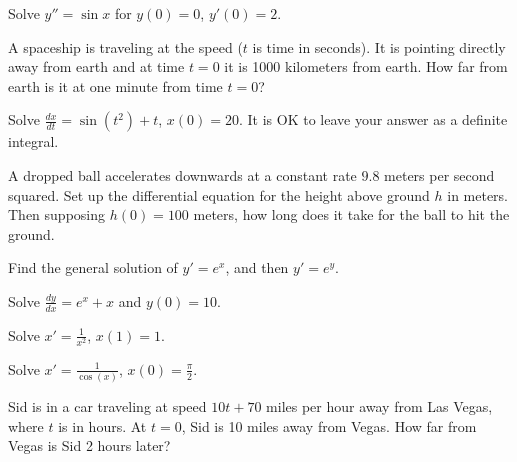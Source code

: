 \documentclass[12pt]{book}
\begin{document}
\begin{exercise}[harder]
Solve $y'' = \sin x$ for $y(0)=0$, $y'(0) = 2$.
\end{exercise}

\begin{exercise}
A spaceship is traveling at the speed  ($t$ is
time in seconds).  It is pointing directly away from earth and at time $t=0$
it is 1000 kilometers from earth.  How far from earth is it at one minute from
time $t=0$?
\end{exercise}

\begin{exercise}
Solve $\frac{dx}{dt} = \sin(t^2)+t$, $x(0)=20$.  It is OK to leave your
answer as a definite integral.
\end{exercise}

\begin{exercise}
A dropped ball accelerates downwards at a constant rate $9.8$ meters per second
squared.  Set up the differential equation for the height above ground $h$ in meters.
Then supposing $h(0) = 100$ meters, how long does it take for the ball to hit
the ground.
\end{exercise}

\begin{exercise}
Find the general solution of
$y' = e^x$,  and then $y' = e^y$.
\end{exercise}


\setcounter{exercise}{100}

\begin{exercise}
Solve $\frac{dy}{dx} = e^x + x$ and $y(0) = 10$.
\end{exercise}

\begin{exercise}
Solve $x' = \frac{1}{x^2}$, $x(1)=1$.
\end{exercise}

\begin{exercise}
Solve $x' = \frac{1}{\cos(x)}$, $x(0)=\frac{\pi}{2}$.
\end{exercise}

\begin{exercise}
Sid is in a car traveling at speed $10t+70$ miles per hour away from Las Vegas,
where $t$ is in hours.  At $t=0$, Sid is 10 miles away from Vegas.  How
far from Vegas is Sid 2 hours later?
\end{exercise}
\end{document}
